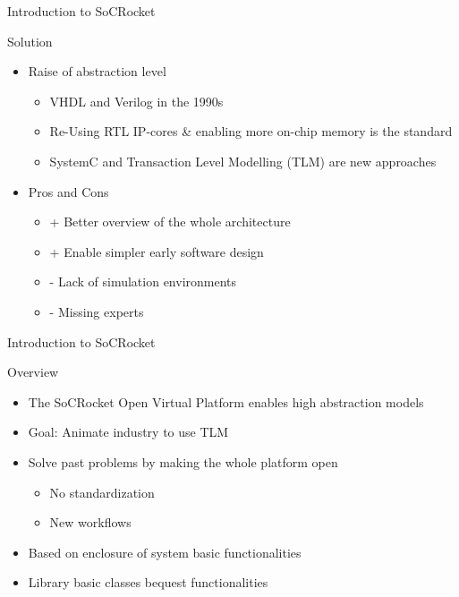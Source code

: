 \begin{frame}{Introduction to SoCRocket}
\begin{block}{Solution}
  \begin{itemize}
		\item Raise of abstraction level
			\begin{itemize}
				\item VHDL and Verilog in the 1990s
				\item	Re-Using RTL IP-cores \& enabling more on-chip memory is the standard 
				\item	SystemC and Transaction Level Modelling (TLM) are new approaches
			\end{itemize}
		\item Pros and Cons
			\begin{itemize}
				\item + Better overview of the whole architecture
				\item + Enable simpler early software design
				\item - Lack of simulation environments
				\item - Missing experts
			\end{itemize}
		\end{itemize}
\end{block}
\end{frame}


\begin{frame}{Introduction to SoCRocket}
\begin{block}{Overview}
  \begin{itemize}
		\item The SoCRocket Open Virtual Platform enables high abstraction models
		\item Goal: Animate industry to use TLM
		\item Solve past problems by making the whole platform open
			\begin{itemize}
				\item No standardization
				\item New workflows
			\end{itemize} 
		\item Based on enclosure of system basic functionalities 
		\item Library basic classes bequest functionalities
	\end{itemize}
\end{block}
\end{frame}



